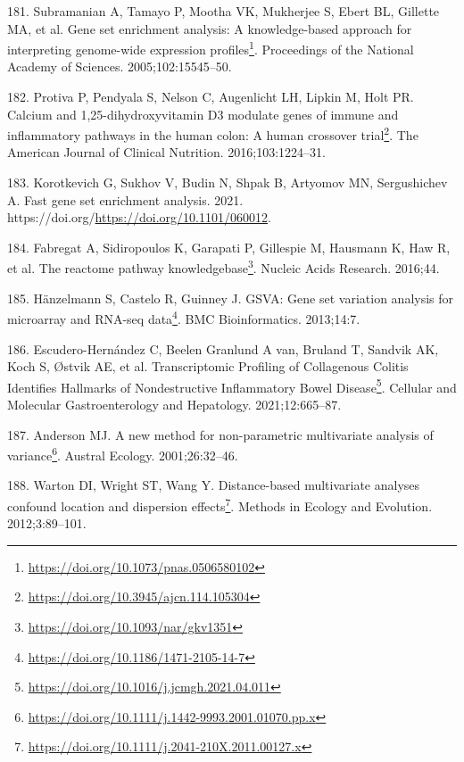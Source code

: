 \documentclass[
  a4paper,
]{book}
\DeclareRobustCommand{\href}[2]{#2\footnote{\url{#1}}}
\newlength{\cslhangindent}
\newlength{\cslentryspacingunit} %
\newenvironment{CSLReferences}[2] %
 {%
  \setlength{\parindent}{0pt}
  \ifodd #1
  \let\oldpar\par
  \def\par{\hangindent=\cslhangindent\oldpar}
  \fi
  \setlength{\parskip}{#2\cslentryspacingunit}
 }%
 {}
\begin{document}
\begin{CSLReferences}{0}{0}
\leavevmode{}%
181. Subramanian A, Tamayo P, Mootha VK, Mukherjee S, Ebert BL, Gillette MA, et al. \href{https://doi.org/10.1073/pnas.0506580102}{Gene set enrichment analysis: A knowledge-based approach for interpreting genome-wide expression profiles}. Proceedings of the National Academy of Sciences. 2005;102:15545--50.

\leavevmode{}%
182. Protiva P, Pendyala S, Nelson C, Augenlicht LH, Lipkin M, Holt PR. \href{https://doi.org/10.3945/ajcn.114.105304}{Calcium and 1,25-dihydroxyvitamin D3 modulate genes of immune and inflammatory pathways in the human colon: A human crossover trial}. The American Journal of Clinical Nutrition. 2016;103:1224--31.

\leavevmode{}%
183. Korotkevich G, Sukhov V, Budin N, Shpak B, Artyomov MN, Sergushichev A. Fast gene set enrichment analysis. 2021. https://doi.org/\url{https://doi.org/10.1101/060012}.

\leavevmode{}%
184. Fabregat A, Sidiropoulos K, Garapati P, Gillespie M, Hausmann K, Haw R, et al. \href{https://doi.org/10.1093/nar/gkv1351}{The reactome pathway knowledgebase}. Nucleic Acids Research. 2016;44.

\leavevmode{}%
185. Hänzelmann S, Castelo R, Guinney J. \href{https://doi.org/10.1186/1471-2105-14-7}{GSVA: Gene set variation analysis for microarray and RNA-seq data}. BMC Bioinformatics. 2013;14:7.

\leavevmode{}%
186. Escudero-Hernández C, Beelen Granlund A van, Bruland T, Sandvik AK, Koch S, Østvik AE, et al. \href{https://doi.org/10.1016/j.jcmgh.2021.04.011}{Transcriptomic Profiling of Collagenous Colitis Identifies Hallmarks of Nondestructive Inflammatory Bowel Disease}. Cellular and Molecular Gastroenterology and Hepatology. 2021;12:665--87.

\leavevmode{}%
187. Anderson MJ. \href{https://doi.org/10.1111/j.1442-9993.2001.01070.pp.x}{A new method for non-parametric multivariate analysis of variance}. Austral Ecology. 2001;26:32--46.

\leavevmode{}%
188. Warton DI, Wright ST, Wang Y. \href{https://doi.org/10.1111/j.2041-210X.2011.00127.x}{Distance-based multivariate analyses confound location and dispersion effects}. Methods in Ecology and Evolution. 2012;3:89--101.


\end{CSLReferences}
\end{document}
